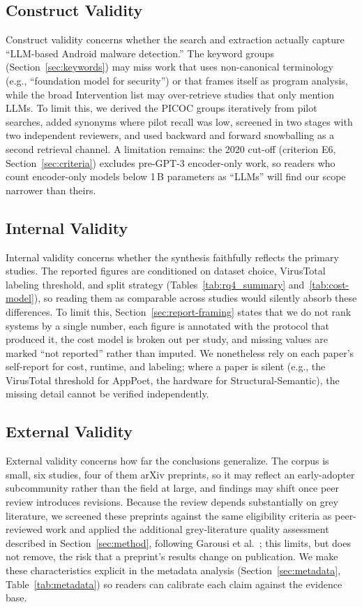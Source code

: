 \subsection{Construct Validity}
Construct validity concerns whether the search and extraction actually capture ``LLM-based Android malware detection.'' The keyword groups (Section~\ref{sec:keywords}) may miss work that uses non-canonical terminology (e.g., ``foundation model for security'') or that frames itself as program analysis, while the broad Intervention list may over-retrieve studies that only mention LLMs. To limit this, we derived the PICOC groups iteratively from pilot searches, added synonyms where pilot recall was low, screened in two stages with two independent reviewers, and used backward and forward snowballing as a second retrieval channel. A limitation remains: the 2020 cut-off (criterion E6, Section~\ref{sec:criteria}) excludes pre-GPT-3 encoder-only work, so readers who count encoder-only models below 1\,B parameters as ``LLMs'' will find our scope narrower than theirs.

\subsection{Internal Validity}
Internal validity concerns whether the synthesis faithfully reflects the primary studies. The reported figures are conditioned on dataset choice, VirusTotal labeling threshold, and split strategy (Tables~\ref{tab:rq4_summary} and~\ref{tab:cost-model}), so reading them as comparable across studies would silently absorb these differences. To limit this, Section~\ref{sec:report-framing} states that we do not rank systems by a single number, each figure is annotated with the protocol that produced it, the cost model is broken out per study, and missing values are marked ``not reported'' rather than imputed. We nonetheless rely on each paper's self-report for cost, runtime, and labeling; where a paper is silent (e.g., the VirusTotal threshold for AppPoet, the hardware for Structural-Semantic), the missing detail cannot be verified independently.

\subsection{External Validity}
External validity concerns how far the conclusions generalize. The corpus is small, six studies, four of them arXiv preprints, so it may reflect an early-adopter subcommunity rather than the field at large, and findings may shift once peer review introduces revisions. Because the review depends substantially on grey literature, we screened these preprints against the same eligibility criteria as peer-reviewed work and applied the additional grey-literature quality assessment described in Section~\ref{sec:method}, following Garousi et al.~\cite{garousi2019mlr}; this limits, but does not remove, the risk that a preprint's results change on publication. We make these characteristics explicit in the metadata analysis (Section~\ref{sec:metadata}, Table~\ref{tab:metadata}) so readers can calibrate each claim against the evidence base.

